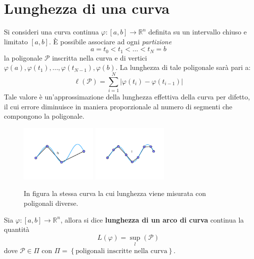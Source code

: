 \section{Lunghezza di una curva}
Si consideri una curva continua $\varphi:[a,b] \to \mathbb{R}^n$ definita su un intervallo chiuso e limitato $[a,b]$. È possibile associare ad ogni \textit{partizione} 
\begin{equation}
    a=t_0<t_1<...<t_N=b
\end{equation}
la poligonale $\mathcal{P}$ inscritta nella curva e di vertici $\varphi(a),\varphi(t_1),\dots,\varphi(t_{N-1}), \varphi(b)$. La lunghezza di tale poligonale sarà pari a:
\begin{equation}
    \ell(\mathcal{P})=\sum\limits_{i=1}^{N}{|\varphi(t_i)-\varphi(t_{i-1})|}
\end{equation}
Tale valore è un'approssimazione della lunghezza effettiva della curva per difetto, il cui errore diminuisce in maniera proporzionale al numero di segmenti che compongono la poligonale.
\begin{figure}[H]
    \centering
    \includegraphics[width=0.33\textwidth]{Capitoli/Capitolo1/lunghezza1.png}
    \hspace{0.05\textwidth} %
    \includegraphics[width=0.33\textwidth]{Capitoli/Capitolo1/lunghezza2.png}
    \caption{In figura la stessa curva la cui lunghezza viene misurata con poligonali diverse.}
\end{figure}
\begin{definition}
    Sia $\varphi:[a,b]\to \mathbb{R}^n$, allora si dice \textbf{lunghezza di un arco di curva} continua la quantità
    \begin{equation}
        L(\varphi)=\sup\limits_{l}(\mathcal{P})
    \end{equation}
    dove $\mathcal{P} \in \Pi$ con $\Pi=\left\{\text{poligonali inscritte nella curva}\right\}$.
\end{definition}
